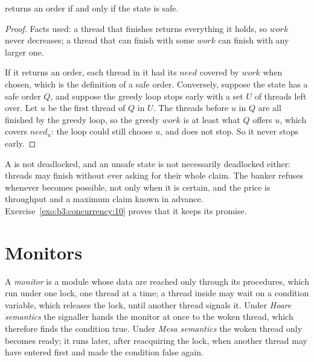 \label{lst:b3:concurrency:banker}

\label{out:b3:concurrency:banker}

\begin{theorem}\label{thm:b3:concurrency:greedy}
 returns an order if and only if the state is safe.
\end{theorem}

\begin{proof}
Facts used: a thread that finishes returns everything it holds, so $\mathit{work}$ never decreases; a thread that can finish with some $\mathit{work}$ can finish with any larger one.

If it returns an order, each thread in it had its $\mathit{need}$ covered by $\mathit{work}$ when chosen, which is the definition of a safe order. Conversely, suppose the state has a safe order $Q$, and suppose the greedy loop stops early with a set $U$ of threads left over. Let $u$ be the first thread of $Q$ in $U$. The threads before $u$ in $Q$ are all finished by the greedy loop, so the greedy $\mathit{work}$ is at least what $Q$ offers $u$, which covers $\mathit{need}_u$: the loop could still choose $u$, and does not stop. So it never stops early.
\end{proof}

A  is not deadlocked, and an unsafe state is not necessarily deadlocked either: threads may finish without ever asking for their whole claim. The banker refuses whenever  becomes possible, not only when it is certain, and the price is throughput and a maximum claim known in advance. Exercise~\ref{exo:b3:concurrency:10} proves that it keeps its promise.

\section{Monitors}\label{sec:b3:concurrency:monitors}

\begin{definition}\label{def:b3:concurrency:monitor}
A \emph{monitor} is a module whose data are reached only through its procedures, which run under one lock, one thread at a time; a thread inside may wait on a condition variable, which releases the lock, until another thread signals it. Under \emph{Hoare semantics} the signaller hands the monitor at once to the woken thread, which therefore finds the condition true. Under \emph{Mesa semantics} the woken thread only becomes ready; it runs later, after reacquiring the lock, when another thread may have entered first and made the condition false again.
\end{definition}

